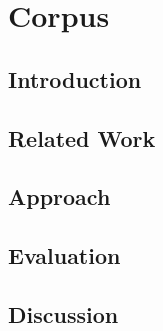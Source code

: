 \chapter{Corpus}

\section{Introduction}
\Blindtext[1]

\section{Related Work}
\Blindtext[1]

\section{Approach}
\Blindtext[1]

\section{Evaluation}
\Blindtext[1]

\section{Discussion}
\Blindtext[1]
